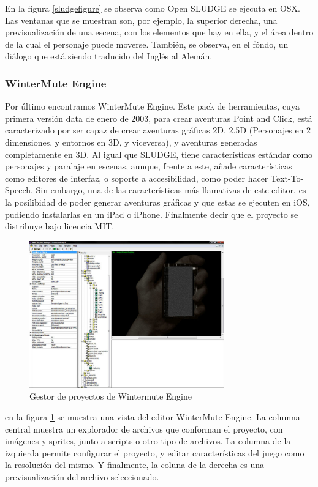 En la figura \ref{sludgefigure} se observa como Open SLUDGE se ejecuta en OSX. Las ventanas que se muestran son, por ejemplo, la superior derecha, una previsualización de una escena, con los elementos que hay en ella, y el área dentro de la cual el personaje puede moverse. También, se observa, en el fóndo, un diálogo que está siendo traducido del Inglés al Alemán.

\subsubsection{WinterMute Engine}
\label{wintermute}

Por último encontramos WinterMute Engine. Este pack de herramientas, cuya primera versión data de enero de 2003, para crear aventuras Point and Click, está caracterizado por ser capaz de crear aventuras gráficas 2D, 2.5D (Personajes en 2 dimensiones, y entornos en 3D, y viceversa), y aventuras generadas completamente en 3D. Al igual que SLUDGE, tiene características estándar como personajes y paralaje en escenas, aunque, frente a este, añade características como editores de interfaz, o soporte a accesibilidad, como poder hacer Text-To-Speech. Sin embargo, una de las características más llamativas de este editor, es la posilibidad de poder generar aventuras gráficas y que estas se ejecuten en iOS, pudiendo instalarlas en un iPad o iPhone. Finalmente decir que el proyecto se distribuye bajo licencia MIT.

\begin{figure}[htb]
	\includegraphics[height=2.5in]{figures/wme.jpg}
	\caption[WinterMute Engine]{Gestor de proyectos de Wintermute Engine}
	\label{wmengine}
\end{figure}

en la figura \ref{wmengine} se muestra una vista del editor WinterMute Engine. La columna central muestra un explorador de archivos que conforman el proyecto, con imágenes y sprites, junto a scripts o otro tipo de archivos. La columna de la izquierda permite configurar el proyecto, y editar características del juego como la resolución del mismo. Y finalmente, la coluna de la derecha es una previsualización del archivo seleccionado.

